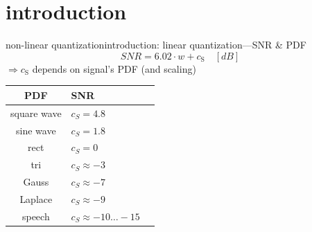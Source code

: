 



\subtitle{Part 12: Non-linear Quantization}


	

\section[intro]{introduction}

\begin{frame}{non-linear quantization}{introduction: linear quantization---SNR \& PDF}
		\begin{equation*}
			SNR = 6.02\cdot w + c_{\mathrm{S}}\quad [dB]
		\end{equation*}
		\pause
        \bigskip
		$\Rightarrow c_{\mathrm{S}}$ depends on signal's PDF (and scaling)
		\begin{table}
			\centering
			\begin{footnotesize}
				\begin{tabular}{clc}
				\hline
				\textbf{PDF} & \textbf{SNR}\\
				\hline
				square wave & $c_S =  4.8$\\
				sine wave & $c_S =  1.8$\\
				rect & $c_S =  0$\\
				tri & $c_S \approx  -3$\\
				Gauss & $c_S \approx  -7$\\
				Laplace & $c_S \approx  -9$\\
				speech & $c_S \approx  -10\ldots -15$\\
				\hline
				\end{tabular}
			\end{footnotesize}
		\end{table}
	\end{frame}	
    

